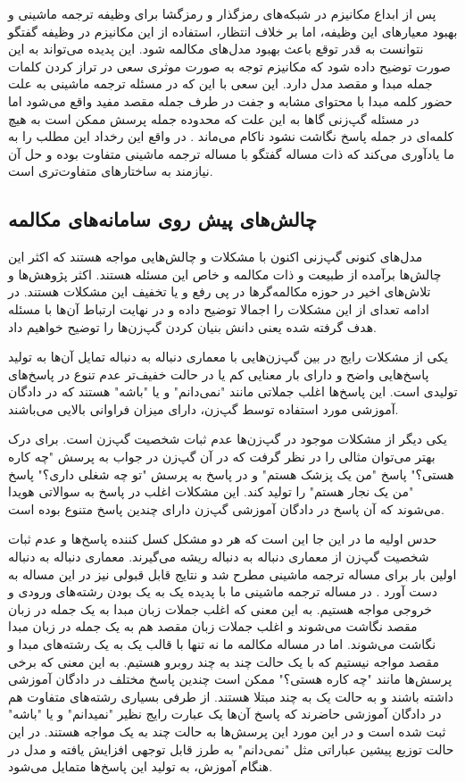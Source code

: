 پس از ابداع مکانیزم
در شبکه‌های رمزگذار و رمزگشا برای وظیفه ترجمه ماشینی و بهبود معیار‌های این وظیفه، اما بر خلاف انتظار، استفاده از این مکانیزم در وظیفه گفتگو نتوانست به قدر توقع باعث بهبود مدل‌های مکالمه شود. این پدیده می‌تواند به این صورت توضیح داده‌ شود که مکانیزم توجه به صورت موثری سعی در تراز کردن کلمات جمله مبدا و مقصد مدل دارد. این سعی با این که در مسئله ترجمه ماشینی به علت حضور کلمه مبدا با محتوای مشابه و جفت در طرف جمله مقصد مفید واقع می‌شود اما در مسئله گپ‌زنی گاها به این علت که محدوده جمله پرسش ممکن است به هیچ کلمه‌ای در جمله پاسخ نگاشت نشود ناکام می‌ماند
\cite{Gao_Neural_Approaches}.
در واقع این رخداد این مطلب را به ما یادآوری می‌کند که ذات مساله گفتگو با مساله ترجمه ماشینی متفاوت بوده و حل آن نیازمند به ساختارهای متفاوت‌تری است.

\subsection{چالش‌های پیش روی سامانه‌های مکالمه}
مدل‌های کنونی گپ‌زنی اکنون با مشکلات و چالش‌هایی مواجه هستند که اکثر این چالش‌ها برآمده از طبیعت و ذات مکالمه و خاص این مسئله هستند. اکثر پژوهش‌ها و تلاش‌های اخیر در حوزه مکالمه‌گرها در پی رفع و یا تخفیف این مشکلات هستند. در ادامه تعدای از این مشکلات را اجمالا توضیح داده و در نهایت ارتباط آن‌ها با مسئله هدف گرفته شده یعنی دانش بنیان کردن گپ‌زن‌ها را توضیح خواهیم داد. 

یکی از مشکلات رایج در بین گپ‌زن‌هایی با معماری دنباله به دنباله تمایل آن‌ها به تولید پاسخ‌هایی واضح و دارای بار معنایی کم یا در حالت  خفیف‌تر عدم تنوع در پاسخ‌های تولیدی است. این پاسخ‌ها اغلب جملاتی مانند 
"نمی‌دانم" و یا "باشه" هستند که در دادگان آموزشی مورد استفاده توسط گپ‌زن، دارای میزان فراوانی بالایی می‌باشند.

یکی دیگر از مشکلات موجود در گپ‌زن‌ها عدم ثبات شخصیت گپ‌زن است. برای درک بهتر می‌توان مثالی را در نظر گرفت که در آن گپ‌زن در جواب به پرسش "چه کاره هستی؟" پاسخ "من یک پزشک هستم" و در پاسخ به پرسش "تو چه شغلی داری؟" پاسخ "من یک نجار هستم" را تولید کند. این مشکلات اغلب در پاسخ به سوالاتی هویدا می‌شوند که آن پاسخ در دادگان آموزشی گپ‌زن دارای چندین پاسخ متنوع بوده است.

حدس اولیه ما در این جا این است که هر دو مشکل کسل کننده پاسخ‌ها و عدم ثبات شخصیت گپ‌زن از معماری دنباله به دنباله ریشه می‌گیرند. معماری دنباله به دنباله اولین بار برای مساله ترجمه ماشینی مطرح شد و نتایج قابل قبولی نیز در این مساله به دست آورد
\cite{seq2seq_paper}.
در مساله ترجمه ماشینی ما با پدیده یک به یک بودن رشته‌های ورودی و خروجی مواجه هستیم. به این معنی که اغلب جملات زبان مبدا به یک جمله در زبان مقصد نگاشت می‌شوند و اغلب جملات زبان مقصد هم به یک جمله در زبان مبدا نگاشت می‌شوند. اما در مساله مکالمه ما نه تنها با قالب یک به یک رشته‌های مبدا و مقصد مواجه نیستیم که با یک حالت چند به چند روبرو هستیم. به این معنی که برخی پرسش‌ها مانند "چه کاره هستی؟" ممکن است چندین پاسخ مختلف در دادگان آموزشی داشته باشند و به حالت یک به چند مبتلا هستند. از طرفی بسیاری رشته‌های متفاوت هم در دادگان آموزشی حاضرند که پاسخ آن‌ها یک عبارت رایج نظیر "نمیدانم" و یا "باشه" ثبت شده است و در این مورد این پرسش‌ها به حالت چند به یک مواجه هستند. در این حالت توزیع پیشین  عباراتی مثل "نمی‌دانم" به طرز قابل توجهی افزایش یافته و مدل در هنگام آموزش، به تولید این پاسخ‌ها متمایل می‌شود.

